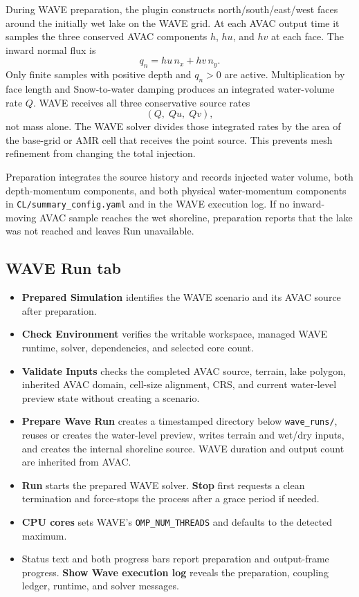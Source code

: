 \documentclass[11pt,a4paper]{article}
\newcommand{\control}[1]{\textbf{#1}}
\newcommand{\pathcode}[1]{\texttt{#1}}
\begin{document}
During WAVE preparation, the plugin constructs north/south/east/west faces
around the initially wet lake on the WAVE grid. At each AVAC output time it
samples the three conserved AVAC components $h$, $hu$, and $hv$ at each face.
The inward normal flux is
\[
q_n = hu\,n_x + hv\,n_y.
\]
Only finite samples with positive depth and $q_n>0$ are active. Multiplication
by face length and Snow-to-water damping produces an integrated water-volume
rate $Q$. WAVE receives all three conservative source rates
\[
(Q,\; Q u,\; Q v),
\]
not mass alone. The WAVE solver divides those integrated rates by the area of
the base-grid or AMR cell that receives the point source. This prevents mesh
refinement from changing the total injection.

Preparation integrates the source history and records injected water volume,
both depth-momentum components, and both physical water-momentum components in
\pathcode{CL/summary\_config.yaml} and in the WAVE execution log. If no
inward-moving AVAC sample reaches the wet shoreline, preparation reports that
the lake was not reached and leaves Run unavailable.

\subsection{WAVE Run tab}

\begin{itemize}
  \item \control{Prepared Simulation} identifies the WAVE scenario and its
        AVAC source after preparation.
  \item \control{Check Environment} verifies the writable workspace, managed
        WAVE runtime, solver, dependencies, and selected core count.
  \item \control{Validate Inputs} checks the completed AVAC source, terrain,
        lake polygon, inherited AVAC domain, cell-size alignment, CRS, and
        current water-level preview state without creating a scenario.
  \item \control{Prepare Wave Run} creates a timestamped directory below
        \pathcode{wave\_runs/}, reuses or creates the water-level preview,
        writes terrain and wet/dry inputs, and creates the internal shoreline
        source. WAVE duration and output count are inherited from AVAC.
  \item \control{Run} starts the prepared WAVE solver. \control{Stop} first
        requests a clean termination and force-stops the process after a grace
        period if needed.
  \item \control{CPU cores} sets WAVE's \pathcode{OMP\_NUM\_THREADS} and
        defaults to the detected maximum.
  \item Status text and both progress bars report preparation and output-frame
        progress. \control{Show Wave execution log} reveals the preparation,
        coupling ledger, runtime, and solver messages.
\end{itemize}
\end{document}
